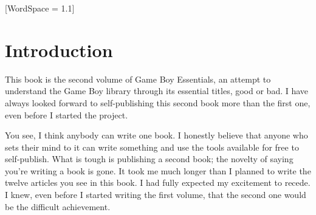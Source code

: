 \documentclass{book}
\newcommand{\gbeauthor}{Pierre-Luc Gagné}
\let\oldcenter\center
\let\oldendcenter\endcenter
\renewenvironment{center}{\setlength\topsep{0pt}\oldcenter}{\oldendcenter}
\begin{document}
\begingroup
\setlength{\columnsep}{1.7mm}
\setlength{\intextsep}{0mm}

\thispagestyle{empty}
\mbox{}
\vskip 70pt
\vfill
\newpage

\thispagestyle{empty}
\mbox{}
\vfill
\begin{center}
\fontsize{10pt}{12pt}\selectfont
{}
\end{center}
\newpage

\thispagestyle{empty}
\mbox{}
\vfill
\begin{raggedleft}
\dedication{\gbededication{}}
\vfill
\end{raggedleft}
\newpage

\begingroup
\let\cleardoublepage\clearpage
\tableofcontents
\endgroup
\thispagestyle{empty}
[WordSpace = 1.1]
\fontsize{12pt}{12pt}\selectfont\begingroup \chapter*{Introduction} \endgroup
This book is the second volume of Game Boy Essentials, an attempt to understand the Game Boy library through its essential titles, good or bad. I have always looked forward to self-publishing this second book more than the first one, even before I started the project.

You see, I think anybody can write one book. I honestly believe that anyone who sets their mind to it can write something and use the tools available for free to self-publish. What is tough is publishing a second book; the novelty of saying you’re writing a book is gone. It took me much longer than I planned to write the twelve articles you see in this book. I had fully expected my excitement to recede. I knew, even before I started writing the first volume, that the second one would be the difficult achievement.
\end{document}
